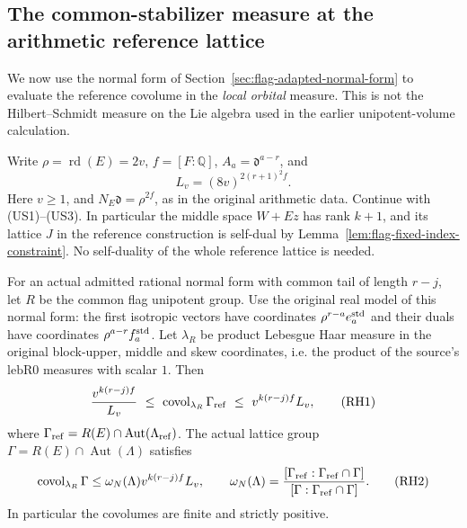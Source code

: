 \subsection{The common-stabilizer measure at the arithmetic reference lattice}
\label{sec:flag-reference-haar}

We now use the normal form of Section~\ref{sec:flag-adapted-normal-form}
to evaluate the reference covolume in the \emph{local orbital}
measure. This is not the Hilbert--Schmidt measure on the Lie
algebra used in the earlier unipotent-volume calculation.

Write \(\rho=\operatorname{rd}(E)=2v\), \(f=[F:\mathbb Q]\),
\(A_a=\mathfrak d^{a-r}\), and
\[
       L_v=(8v)^{2(r+1)^2f}.
\]
Here \(v\ge1\), and \(N_E\mathfrak d=\rho^{2f}\), as in the
original arithmetic data. Continue with (US1)--(US3). In
particular the middle space \(W+Ez\) has rank \(k+1\), and its
lattice \(J\) in the reference construction is self-dual by
Lemma~\ref{lem:flag-fixed-index-constraint}. No self-duality of the
whole reference lattice is needed.

\begin{theorem}
\label{thm:flag-reference-haar}
For an actual admitted rational normal form with common tail of
length \(r-j\), let \(R\) be the common flag unipotent group.
Use the original real model of this normal form: the first
isotropic vectors have coordinates \(\rho^{r-a}e_a^{\rm std}\)
and their duals have coordinates
\(\rho^{a-r}f_a^{\rm std}\). Let \(\lambda_R\) be product
Lebesgue Haar measure in the original block-upper, middle and
skew coordinates, i.e. the product of the source's
\(\mathrm{lebR0}\) measures with scalar \(1\).
Then
\[
 \frac{v^{k(r-j)f}}{L_v}
 \ \le\ \operatorname{covol}_{\lambda_R}\Gamma_{\rm ref}
 \ \le\ v^{k(r-j)f} L_v ,
 \tag{RH1}
\]
where \(\Gamma_{\rm ref}=R(E)\cap\operatorname{Aut}(\Lambda_{\rm ref})\).
The actual lattice group
\(\Gamma=R(E)\cap\operatorname{Aut}(\Lambda)\) satisfies
\[
 \operatorname{covol}_{\lambda_R}\Gamma
       \le \omega_N(\Lambda)v^{k(r-j)f} L_v ,
 \qquad
 \omega_N(\Lambda)=
 \frac{[\Gamma_{\rm ref}:\Gamma_{\rm ref}\cap\Gamma]}
      {[\Gamma:\Gamma_{\rm ref}\cap\Gamma]}.
 \tag{RH2}
\]
In particular the covolumes are finite and strictly positive.
\end{theorem}

